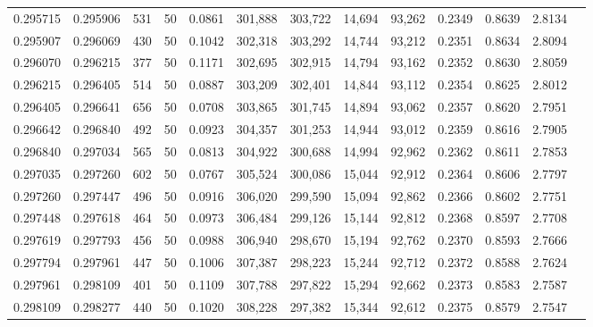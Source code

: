 \begin{tabular}{rrrrrrrrrrrrr}
0.295715 & 0.295906 &   531 &  50 &                                     0.0861 & 301,888 & 303,722 &  14,694 &  93,262 & 0.2349 & 0.8639 & 2.8134 \\
0.295907 & 0.296069 &   430 &  50 &                                     0.1042 & 302,318 & 303,292 &  14,744 &  93,212 & 0.2351 & 0.8634 & 2.8094 \\
0.296070 & 0.296215 &   377 &  50 &                                     0.1171 & 302,695 & 302,915 &  14,794 &  93,162 & 0.2352 & 0.8630 & 2.8059 \\
0.296215 & 0.296405 &   514 &  50 &                                     0.0887 & 303,209 & 302,401 &  14,844 &  93,112 & 0.2354 & 0.8625 & 2.8012 \\
0.296405 & 0.296641 &   656 &  50 &                                     0.0708 & 303,865 & 301,745 &  14,894 &  93,062 & 0.2357 & 0.8620 & 2.7951 \\
0.296642 & 0.296840 &   492 &  50 &                                     0.0923 & 304,357 & 301,253 &  14,944 &  93,012 & 0.2359 & 0.8616 & 2.7905 \\
0.296840 & 0.297034 &   565 &  50 &                                     0.0813 & 304,922 & 300,688 &  14,994 &  92,962 & 0.2362 & 0.8611 & 2.7853 \\
0.297035 & 0.297260 &   602 &  50 &                                     0.0767 & 305,524 & 300,086 &  15,044 &  92,912 & 0.2364 & 0.8606 & 2.7797 \\
0.297260 & 0.297447 &   496 &  50 &                                     0.0916 & 306,020 & 299,590 &  15,094 &  92,862 & 0.2366 & 0.8602 & 2.7751 \\
0.297448 & 0.297618 &   464 &  50 &                                     0.0973 & 306,484 & 299,126 &  15,144 &  92,812 & 0.2368 & 0.8597 & 2.7708 \\
0.297619 & 0.297793 &   456 &  50 &                                     0.0988 & 306,940 & 298,670 &  15,194 &  92,762 & 0.2370 & 0.8593 & 2.7666 \\
0.297794 & 0.297961 &   447 &  50 &                                     0.1006 & 307,387 & 298,223 &  15,244 &  92,712 & 0.2372 & 0.8588 & 2.7624 \\
0.297961 & 0.298109 &   401 &  50 &                                     0.1109 & 307,788 & 297,822 &  15,294 &  92,662 & 0.2373 & 0.8583 & 2.7587 \\
0.298109 & 0.298277 &   440 &  50 &                                     0.1020 & 308,228 & 297,382 &  15,344 &  92,612 & 0.2375 & 0.8579 & 2.7547 \\

\end{tabular}

